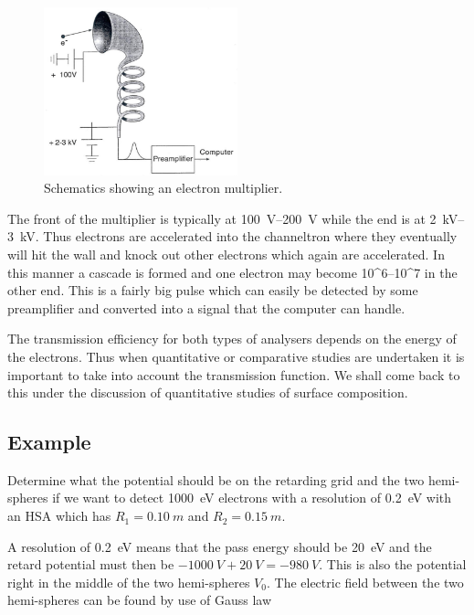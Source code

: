 \begin{figure}[htbp]
\centering
\includegraphics[width=0.5\textwidth]{figures/03_03}
\caption{Schematics showing an electron multiplier.}
\label{fig:electron_multiplier}
\end{figure}

The front of the multiplier is typically at  \SIrange{100}{200}{V} while the end is at \SIrange{2}{3}{kV}. Thus electrons are accelerated into the channeltron where they eventually will hit the wall and knock out other electrons which again are accelerated. In this manner a cascade is formed and one electron may become \numrange[range-phrase = --]{10^6}{10^7} in the other end. This is a fairly big pulse which can easily be detected by some preamplifier and converted into a signal that the computer can handle.

The transmission efficiency for both types of analysers depends on the energy of the electrons. Thus when quantitative or comparative studies are undertaken it is important to take into account the transmission function. We shall come back to this under the discussion of quantitative studies of surface composition.

\subsection{Example}
Determine what the potential should be on the retarding grid and the two hemi-spheres if we want to detect \SI{1000}{\electronvolt} electrons with a resolution of \SI{0.2}{\electronvolt} with an HSA which has $R_{1}=\SI{0.10}{m}$ and $R_{2}=\SI{0.15}{m}$.

A resolution of \SI{0.2}{\electronvolt} means that the pass energy should be \SI{20}{\electronvolt} and the retard potential must then be $\SI{-1000}{V}+\SI{20}{V}=\SI{-980}{V}$. This is also the potential right in the middle of the two hemi-spheres $V_{0}$. The electric field between the two hemi-spheres can be found by use of Gauss law


